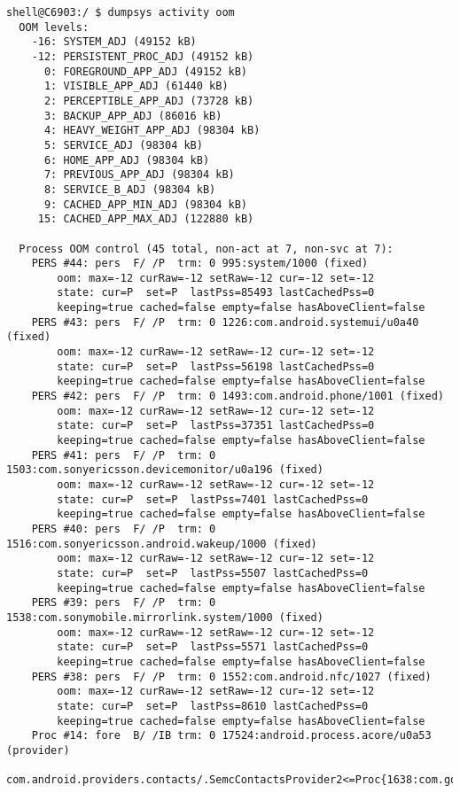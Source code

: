 \begin{lstlisting}[frame=single] 
shell@C6903:/ $ dumpsys activity oom
  OOM levels:
    -16: SYSTEM_ADJ (49152 kB)
    -12: PERSISTENT_PROC_ADJ (49152 kB)
      0: FOREGROUND_APP_ADJ (49152 kB)
      1: VISIBLE_APP_ADJ (61440 kB)
      2: PERCEPTIBLE_APP_ADJ (73728 kB)
      3: BACKUP_APP_ADJ (86016 kB)
      4: HEAVY_WEIGHT_APP_ADJ (98304 kB)
      5: SERVICE_ADJ (98304 kB)
      6: HOME_APP_ADJ (98304 kB)
      7: PREVIOUS_APP_ADJ (98304 kB)
      8: SERVICE_B_ADJ (98304 kB)
      9: CACHED_APP_MIN_ADJ (98304 kB)
     15: CACHED_APP_MAX_ADJ (122880 kB)

  Process OOM control (45 total, non-act at 7, non-svc at 7):
    PERS #44: pers  F/ /P  trm: 0 995:system/1000 (fixed)
        oom: max=-12 curRaw=-12 setRaw=-12 cur=-12 set=-12
        state: cur=P  set=P  lastPss=85493 lastCachedPss=0
        keeping=true cached=false empty=false hasAboveClient=false
    PERS #43: pers  F/ /P  trm: 0 1226:com.android.systemui/u0a40 (fixed)
        oom: max=-12 curRaw=-12 setRaw=-12 cur=-12 set=-12
        state: cur=P  set=P  lastPss=56198 lastCachedPss=0
        keeping=true cached=false empty=false hasAboveClient=false
    PERS #42: pers  F/ /P  trm: 0 1493:com.android.phone/1001 (fixed)
        oom: max=-12 curRaw=-12 setRaw=-12 cur=-12 set=-12
        state: cur=P  set=P  lastPss=37351 lastCachedPss=0
        keeping=true cached=false empty=false hasAboveClient=false
    PERS #41: pers  F/ /P  trm: 0 1503:com.sonyericsson.devicemonitor/u0a196 (fixed)
        oom: max=-12 curRaw=-12 setRaw=-12 cur=-12 set=-12
        state: cur=P  set=P  lastPss=7401 lastCachedPss=0
        keeping=true cached=false empty=false hasAboveClient=false
    PERS #40: pers  F/ /P  trm: 0 1516:com.sonyericsson.android.wakeup/1000 (fixed)
        oom: max=-12 curRaw=-12 setRaw=-12 cur=-12 set=-12
        state: cur=P  set=P  lastPss=5507 lastCachedPss=0
        keeping=true cached=false empty=false hasAboveClient=false
    PERS #39: pers  F/ /P  trm: 0 1538:com.sonymobile.mirrorlink.system/1000 (fixed)
        oom: max=-12 curRaw=-12 setRaw=-12 cur=-12 set=-12
        state: cur=P  set=P  lastPss=5571 lastCachedPss=0
        keeping=true cached=false empty=false hasAboveClient=false
    PERS #38: pers  F/ /P  trm: 0 1552:com.android.nfc/1027 (fixed)
        oom: max=-12 curRaw=-12 setRaw=-12 cur=-12 set=-12
        state: cur=P  set=P  lastPss=8610 lastCachedPss=0
        keeping=true cached=false empty=false hasAboveClient=false
    Proc #14: fore  B/ /IB trm: 0 17524:android.process.acore/u0a53 (provider)
        com.android.providers.contacts/.SemcContactsProvider2<=Proc{1638:com.google.process.gapps/u0a36}

\end{lstlisting}
